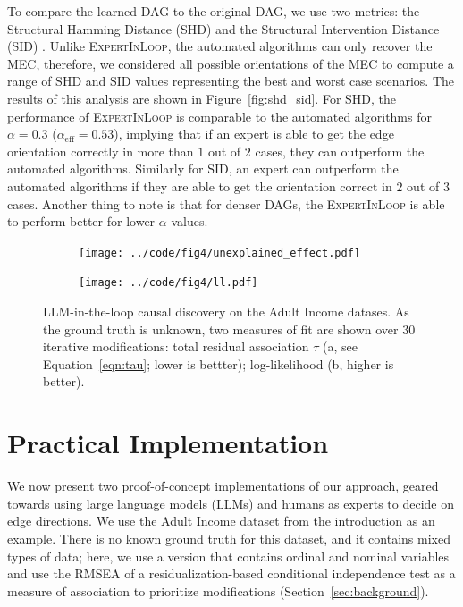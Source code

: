 \documentclass[accepted]{uai2025} %
\begin{document}
To compare the learned DAG to the original DAG, we use two metrics: the Structural
Hamming Distance (SHD) and the Structural Intervention Distance (SID)
\citep{Peters2015}. Unlike \textsc{ExpertInLoop}, the automated algorithms can
only recover the MEC, therefore, we considered all possible orientations of the
MEC to compute a range of SHD and SID values representing the best and worst
case scenarios. The results of this analysis are shown in
Figure~\ref{fig:shd_sid}. For SHD, the performance of \textsc{ExpertInLoop} is
comparable to the automated algorithms for $ \alpha = 0.3$
($\alpha_{\textrm{eff}} = 0.53 $), implying that if an expert is able to get the
edge orientation correctly in more than $ 1 $ out of $ 2 $ cases, they can
outperform the automated algorithms. Similarly for SID, an expert can outperform 
the automated algorithms if they are able to get the orientation correct in $ 2 $ 
out of $ 3 $ cases. Another thing to note is that for denser DAGs, the 
\textsc{ExpertInLoop} is able to perform better for lower $ \alpha $ values.

\begin{figure}[t!]
	\begin{subfigure}{0.25\textwidth}
		\centering
		\texttt{[image: ../code/fig4/unexplained\_effect.pdf]}
		\caption{}
	\end{subfigure}%
	\begin{subfigure}{0.25\textwidth}
		\centering
		\texttt{[image: ../code/fig4/ll.pdf]}
		\caption{}
	\end{subfigure}
	\caption{LLM-in-the-loop causal discovery on the Adult Income datases. As the ground 
truth is unknown, two measures of fit are shown over 30 iterative modifications: 
total residual association $\tau$ (a, see Equation~\ref{eqn:tau}; lower is bettter); log-likelihood (b, higher is better).
	}
	\label{fig:unexplained_ll}
\end{figure}

\section{Practical Implementation}

\label{sec:web}

We now present two proof-of-concept implementations of our approach, 
geared towards using  large language models (LLMs) and humans as experts
to decide on edge directions. We use the Adult Income dataset from the 
introduction as an example. There is no known ground truth for this dataset,
and it contains mixed types of data; here, we use a version that contains
ordinal and nominal variables and use the RMSEA of a residualization-based
conditional independence test \citep{Ankan2023} as a measure of association
to prioritize modifications (Section~\ref{sec:background}). 
\end{document}
